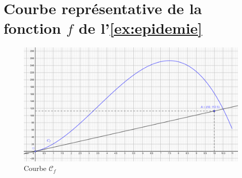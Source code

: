 \section{Courbe représentative de la fonction $f$ de l'\ref{ex:epidemie}}\label{app:fig}

	\begin{figure}[h]
		
		\includegraphics[scale=0.7]{img/courbe_epidemie}
		
		\caption{Courbe $\mathcal{C}_f$}
		\label{fig:c}
	\end{figure}
